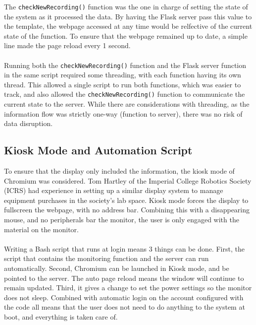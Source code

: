 \documentclass[main.tex]{subfiles}
\begin{document}
The \texttt{checkNewRecording()} function was the one in charge of setting the state of the system as it processed the data. By having the Flask server pass this value to the template, the webpage accessed at any time would be relfective of the current state of the function. To ensure that the webpage remained up to date, a simple line made the page reload every 1 second.
\\\\
Running both the \texttt{checkNewRecording()} function and the Flask server function in the same script required some threading, with each function having its own thread. This allowed a single script to run both functions, which was easier to track, and also allowed the \texttt{checkNewRecording()} function to communicate the current state to the server. While there are considerations with threading, as the information flow was strictly one-way (function to server), there was no risk of data disruption.

\subsection{Kiosk Mode and Automation Script}
To ensure that the display only included the information, the kiosk mode of Chromium was considered. Tom Hartley of the Imperial College Robotics Society (ICRS) had experience in setting up a similar display system to manage equipment purchases in the society's lab space. Kiosk mode forces the display to fullscreen the webpage, with no address bar. Combining this with a disappearing mouse, and no peripherals bar the monitor, the user is only engaged with the material on the monitor.
\\\\
Writing a Bash script that runs at login means 3 things can be done. First, the script that contains the monitoring function and the server can run automatically. Second, Chromium can be launched in Kiosk mode, and be pointed to the server. The auto page reload means the window will continue to remain updated. Third, it gives a change to set the power settings so the monitor does not sleep. Combined with automatic login on the account configured with the code all means that the user does not need to do anything to the system at boot, and everything is taken care of. 
\end{document}
